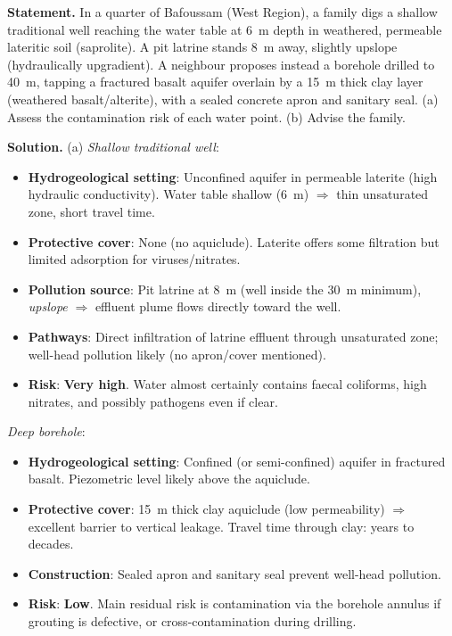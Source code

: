 \documentclass[11pt]{article}
\begin{document}
\begin{exoresolu}
\textbf{Statement.} In a quarter of Bafoussam (West Region), a family digs a shallow traditional well reaching the water table at \SI{6}{m} depth in weathered, permeable lateritic soil (saprolite). A pit latrine stands \SI{8}{m} away, slightly upslope (hydraulically upgradient). A neighbour proposes instead a borehole drilled to \SI{40}{m}, tapping a fractured basalt aquifer overlain by a \SI{15}{m} thick clay layer (weathered basalt/alterite), with a sealed concrete apron and sanitary seal. (a) Assess the contamination risk of each water point. (b) Advise the family.

\tcblower
\textbf{Solution.} (a) \emph{Shallow traditional well}: 
\begin{itemize}
\item \textbf{Hydrogeological setting}: Unconfined aquifer in permeable laterite (high hydraulic conductivity). Water table shallow (\SI{6}{m}) $\Rightarrow$ thin unsaturated zone, short travel time.
\item \textbf{Protective cover}: None (no aquiclude). Laterite offers some filtration but limited adsorption for viruses/nitrates.
\item \textbf{Pollution source}: Pit latrine at \SI{8}{m} (well inside the \SI{30}{m} minimum), \emph{upslope} $\Rightarrow$ effluent plume flows directly toward the well.
\item \textbf{Pathways}: Direct infiltration of latrine effluent through unsaturated zone; well-head pollution likely (no apron/cover mentioned).
\item \textbf{Risk}: \textbf{Very high}. Water almost certainly contains faecal coliforms, high nitrates, and possibly pathogens even if clear.
\end{itemize}
\emph{Deep borehole}:
\begin{itemize}
\item \textbf{Hydrogeological setting}: Confined (or semi-confined) aquifer in fractured basalt. Piezometric level likely above the aquiclude.
\item \textbf{Protective cover}: \SI{15}{m} thick clay aquiclude (low permeability) $\Rightarrow$ excellent barrier to vertical leakage. Travel time through clay: years to decades.
\item \textbf{Construction}: Sealed apron and sanitary seal prevent well-head pollution.
\item \textbf{Risk}: \textbf{Low}. Main residual risk is contamination via the borehole annulus if grouting is defective, or cross-contamination during drilling.

\end{itemize}
\end{exoresolu}
\end{document}
